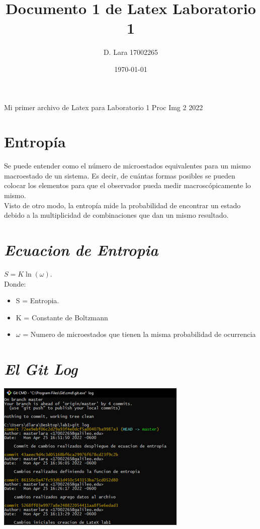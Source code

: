 \documentclass{article}[12pt, letterpaper]
\title{Documento 1 de Latex Laboratorio 1}
\author{D. Lara 17002265}
\date{\today}
\begin{document}
	\maketitle
	Mi primer archivo de Latex para Laboratorio 1 Proc Img 2 2022
	
	\section{Entropía} 

	Se puede entender como el número de microestados equivalentes para un mismo macroestado de un sistema. Es decir, de cuántas formas posibles se pueden colocar los elementos para que el observador pueda medir macroscópicamente lo mismo.\\ %
	
	Visto de otro modo, la entropía mide la probabilidad de encontrar un estado debido a la multiplicidad de combinaciones que dan un mismo resultado.
	
	\section{\textit{Ecuacion de Entropia}}
	$S = K\ln(\omega)$.	\\ %
	
	Donde:
	\begin{itemize} 
		\item S = Entropia.
		\item K = Constante de Boltzmann
		\item $\omega$ = Numero de microestados que tienen la misma probabilidad de ocurrencia
	
		
	\end{itemize}
	
	\section{\textit{El Git Log}}
	
	\includegraphics{log_git_ss}
	
\end{document}
